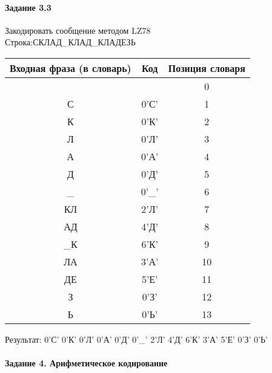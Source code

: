 \documentclass[a4paper, 12pt]{article}
\begin{document}
\paragraph{Задание 3.3}

Закодировать сообщение методом LZ78\\
Строка:СКЛАД\_КЛАД\_КЛАДЕЗЬ\\
\begin{table}[h!]
\centering
\begin{tabular}{|c|c|c|} 
\hline
 Входная фраза (в словарь) & Код & Позиция словаря \\ \hline

 &  & 0 \\ \hline
С & 0'С' & 1 \\ \hline
К & 0'К' & 2 \\ \hline
Л & 0'Л' & 3 \\ \hline
А & 0'А' & 4 \\ \hline
Д & 0'Д' & 5 \\ \hline
\_ & 0'\_' & 6 \\ \hline
КЛ & 2'Л' & 7 \\ \hline
АД & 4'Д' & 8 \\ \hline
\_К & 6'К' & 9 \\ \hline
ЛА & 3'А' & 10 \\ \hline
ДЕ & 5'Е' & 11 \\ \hline
З & 0'З' & 12 \\ \hline
Ь & 0'Ь' & 13 \\ \hline
\end{tabular}
\end{table}

Результат: 0'С' 0'К' 0'Л' 0'А' 0'Д' 0'\_' 2'Л' 4'Д' 6'К' 3'А' 5'Е' 0'З' 0'Ь'\\
\pagebreak
\paragraph{Задание 4. Арифметическое кодирование\\}
\end{document}
